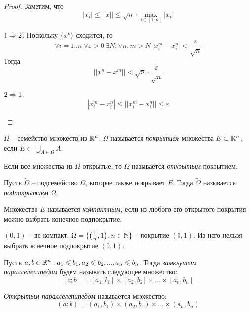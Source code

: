     \begin{proof}
        Заметим, что 
        \[|x_i| \leqslant ||x|| \leqslant \sqrt{n} \cdot \max_{i \in [1, n]} |x_i|\]
        \begin{MyList}
            \item[] $1 \Rightarrow 2$. Поскольку $\{x^k\}$ сходится, то 
            \[\forall i = 1..n \ \forall \varepsilon > 0 \ \exists N : \forall n, m > N \ |x_i^m - x_i^n| < \frac{\varepsilon}{\sqrt{n}}\]
            Тогда
            \[||x^n - x^m|| < \sqrt{n} \cdot \frac{\varepsilon}{\sqrt{n}}\]

            \item[] $2 \Rightarrow 1$.
            \[|x_i^m - x_i^n| \leqslant ||x_i^m - x_i^n|| \leqslant \varepsilon\]
        \end{MyList}
    \end{proof}

    \begin{Def}[Покрытие]
        $\Omega$ -- семейство множеств из $\mathbb{R}^n$. $\Omega$ называется \textit{покрытием}  множества $E \subset \mathbb{R}^n$, если $E \subset \bigcup_{A \in \Omega} A$. 
    \end{Def}

    \begin{Def}
        Если все множества из $\Omega$ открытые, то $\Omega$ называется \textit{открытым} покрытием.
    \end{Def}

    \begin{Def}
        Пусть $\widetilde{\Omega}$ -- подсемейство $\Omega$, которое также покрывает $E$. Тогда $\widetilde{\Omega}$ называется \textit{подпокрытием} $\Omega$. 
    \end{Def}

    \begin{Def}
        Множество $E$ называется \textit{компактным}, если из любого его открытого покрытия можно выбрать конечное подпокрытие.
    \end{Def}

    \begin{Example}
        $(0, 1)$ -- не компакт. $\Omega = \{\left(\frac{1}{n}, 1\right), n \in \mathbb{N}\}$ -- покрытие $(0, 1)$. Из него нельзя выбрать конечное подпокрытие $(0, 1)$.
    \end{Example}

    \begin{Def}
        Пусть $a, b \in \mathbb{R}^n : a_1 \leqslant b_1, a_2 \leqslant b_2, ..., a_n \leqslant b_n$. 
        Тогда \textit{замкнутым параллелепипедом} будем называть следующее множество:
        \[[a; b] = [a_1, b_1] \times [a_2, b_2] \times ... \times [a_n, b_n]\]  

        \textit{Открытым параллелепипедом} называется множество:
        \[(a; b) = (a_1, b_1) \times (a_2, b_2) \times ... \times (a_n, b_n)\]
    \end{Def}

